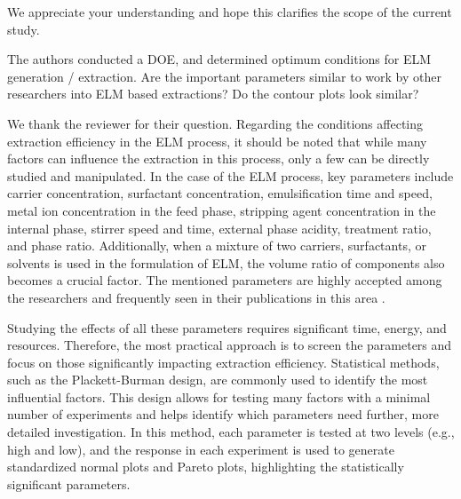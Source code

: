 \documentclass[11pt,answers]{exam}
\begin{document}
\begin{questions}
\begin{solutionorbox}[5.5cm]
We appreciate your understanding and hope this clarifies the scope of the current study.

 \end{solutionorbox}

\question The authors conducted a DOE, and determined optimum conditions for ELM generation / extraction.  Are the important parameters similar to work by other researchers into ELM based extractions?  Do the contour plots look similar?

\begin{solutionorbox}[5.5cm]

We thank the reviewer for their question. Regarding the conditions affecting extraction efficiency in the ELM process, it should be noted that while many factors can influence the extraction in this process, only a few can be directly studied and manipulated. In the case of the ELM process, key parameters include carrier concentration, surfactant concentration, emulsification time and speed, metal ion concentration in the feed phase, stripping agent concentration in the internal phase, stirrer speed and time, external phase acidity, treatment ratio, and phase ratio. Additionally, when a mixture of two carriers, surfactants, or solvents is used in the formulation of ELM, the volume ratio of components also becomes a crucial factor. The mentioned parameters are highly accepted among the researchers and frequently seen in their publications in this area \cite{https://doi.org/10.1002/cjce.23418}\cite{KUMBASAR20122076}\cite{MA201788}\cite{SUJATHA2021108444}\cite{SULIMAN2023121261}\cite{ADMAWI2023101081}.

Studying the effects of all these parameters requires significant time, energy, and resources. Therefore, the most practical approach is to screen the parameters and focus on those significantly impacting extraction efficiency. Statistical methods, such as the Plackett-Burman design, are commonly used to identify the most influential factors. This design allows for testing many factors with a minimal number of experiments and helps identify which parameters need further, more detailed investigation. In this method, each parameter is tested at two levels (e.g., high and low), and the response in each experiment is used to generate standardized normal plots and Pareto plots, highlighting the statistically significant parameters.


\end{solutionorbox}
\end{questions}
\end{document}
